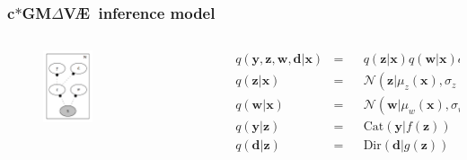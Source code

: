 \documentclass[final]{beamer}
\theoremstyle{plain}
\theoremstyle{definition}
\theoremstyle{remark}
\newcommand{\x}{\mathbf{x}}
\newcommand{\z}{\mathbf{z}}
\newcommand{\y}{\mathbf{y}}
\newcommand{\w}{\mathbf{w}}
\newcommand{\dd}{\mathbf{d}}
\newcommand{\NN}{\mathcal{N}}
\newcommand{\gmvae}{c$\ast$GM$\Delta$V\AE~}
\begin{document}
\begin{frame}
\frametitle{\gmvae inference model}
\begin{columns}[T]
\begin{column}{0.5\linewidth}
\begin{figure}[h]
\centering
\includegraphics[width=0.4\textwidth]{plots/dirichlet_gmm_q.gv.png}
\end{figure}
\end{column}

\begin{column}{0.5\linewidth}
{\tiny
\begin{equation}
\label{eq:gmmqfact}
\begin{aligned}
&q(\y, \z, \w, \dd | \x) &=& 
&q(\z | \x) q(\w | \x) q(\y | \z) q(\dd | \z) \\
&q(\z | \x) &=& &\NN(\z | \mu_z(\x), \sigma_z(\x)) \\
&q(\w | \x) &=& &\NN(\w | \mu_w(\x), \sigma_w(\x)) \\
&q(\y | \z) &=& &\text{Cat}(\y | f(\z)) \\
&q(\dd | \z) &=& &\text{Dir}(\dd | g(\z))
\end{aligned}
\end{equation}
}
\end{column}
\end{columns}
\end{frame}
\end{document}
